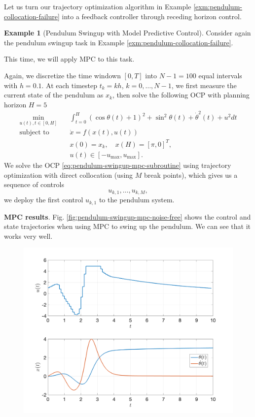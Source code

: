\documentclass[
]{book}
\theoremstyle{definition}
\theoremstyle{definition}
\newtheorem{example}{Example}[chapter]
\theoremstyle{definition}
\theoremstyle{definition}
\theoremstyle{remark}
\begin{document}
Let us turn our trajectory optimization algorithm in Example \ref{exm:pendulum-collocation-failure} into a feedback controller through receding horizon control.

\begin{example}[Pendulum Swingup with Model Predictive Control]
\protect\hypertarget{exm:mpc-pendulum-swingup}{}\label{exm:mpc-pendulum-swingup}Consider again the pendulum swingup task in Example \ref{exm:pendulum-collocation-failure}.

This time, we will apply MPC to this task.

Again, we discretize the time windown \([0,T]\) into \(N-1 = 100\) equal intervals with \(h = 0.1\). At each timestep \(t_k = kh\), \(k=0,\dots,N-1\), we first measure the current state of the pendulum as \(x_k\), then solve the following OCP with planning horizon \(H=5\)
\begin{equation}
\begin{split} \min_{u(t), t \in [0,H]} & \quad \int_{t=0}^H (\cos \theta(t) + 1)^2 + \sin^2\theta(t) + \dot{\theta}^2(t) + u^2 dt \\
\text{subject to} & \quad \dot{x} = f(x(t),u(t)) \\
& \quad x(0) = x_k, \quad x(H) = [\pi,0]^T, \\
& \quad u(t) \in [-u_{\max},u_{\max}].
\end{split}
\label{eq:pendulum-swingup-mpc-subroutine}
\end{equation}
We solve the OCP \eqref{eq:pendulum-swingup-mpc-subroutine} using trajectory optimization with direct collocation (using \(M\) break points), which gives us a sequence of controls
\[
u_{k,1},\dots,u_{k,M},
\]
we deploy the first control \(u_{k,1}\) to the pendulum system.

\textbf{MPC results}. Fig. \ref{fig:pendulum-swingup-mpc-noise-free} shows the control and state trajectories when using MPC to swing up the pendulum. We can see that it works very well.

\begin{figure}

{\centering \includegraphics[width=0.8\linewidth]{images/pendulum_mpc_noise_free} 

}
\end{figure}
\end{example}
\end{document}
